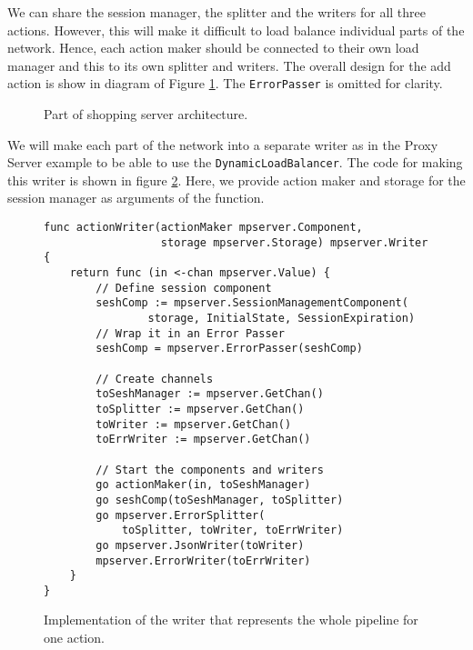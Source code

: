 We can share the session manager, the splitter and the writers for all three actions. 
However, this will make it difficult to load balance individual parts
of the network. Hence, each action maker should be connected to their
own load manager and this to its own splitter and writers. The overall 
design for the add action
is show in diagram of Figure \ref{fig:shoppingDesign}. The \texttt{ErrorPasser} 
is omitted for clarity.
\begin{figure}[h]
\centering
{}
\caption[scale=1.0]{Part of shopping server architecture.}
\label{fig:shoppingDesign}
\end{figure}

We will make each part of the network into a separate writer as in
the Proxy Server example to be able to use the \texttt{DynamicLoadBalancer}.
The code for making this writer is shown in figure \ref{fig:shoppingWriter}.
Here, we provide action maker and storage for the session manager 
as arguments of the function.

\newpage
\begin{figure}[h]
\begin{lstlisting}
func actionWriter(actionMaker mpserver.Component, 
                  storage mpserver.Storage) mpserver.Writer {
    return func (in <-chan mpserver.Value) {
        // Define session component
        seshComp := mpserver.SessionManagementComponent(
                storage, InitialState, SessionExpiration)
        // Wrap it in an Error Passer
        seshComp = mpserver.ErrorPasser(seshComp)

        // Create channels
        toSeshManager := mpserver.GetChan()
        toSplitter := mpserver.GetChan()
        toWriter := mpserver.GetChan()
        toErrWriter := mpserver.GetChan()

        // Start the components and writers
        go actionMaker(in, toSeshManager)
        go seshComp(toSeshManager, toSplitter)
        go mpserver.ErrorSplitter(
            toSplitter, toWriter, toErrWriter)
        go mpserver.JsonWriter(toWriter)
        mpserver.ErrorWriter(toErrWriter)
    }
}
\end{lstlisting}
\caption[scale=1.0]{Implementation of the writer that represents the whole
pipeline for one action.}
\label{fig:shoppingWriter}
\end{figure}

